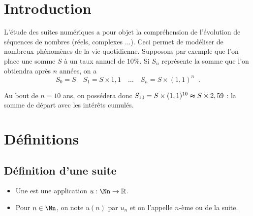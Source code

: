 \documentclass[class=report,crop=false]{standalone}
\begin{document}








\section*{Introduction}

L'étude des suites numériques a pour objet la compréhension de l'évolution de séquences de nombres (réels, complexes ...).
Ceci permet de modéliser de nombreux phénomènes de la vie quotidienne. Supposons par exemple que l'on place une somme
$S$ à un taux annuel de $10\%$. Si $S_n$ représente la somme que l'on obtiendra après $n$ années, on a
$$S_0=S \quad    S_1=S\times 1,1\quad \ldots \quad   S_n=S\times (1,1)^n \;\;.$$

Au bout de $n=10$ ans, on possédera donc $S_{10}=S\times (1,1)^{10}\thickapprox S\times 2,59$ :
la somme de départ avec les intérêts cumulés.



\section{Définitions}

\subsection{Définition d'une suite}
\begin{definition}
\sauteligne
    \begin{itemize}
      \item Une  est une application $u:\Nn\to \Rr$.
      \item Pour $n\in \Nn$, on note $u(n)$ par $u_n$ et on l'appelle $n$-ème{}  ou  de la suite.
    \end{itemize}
\end{definition}
\end{document}
